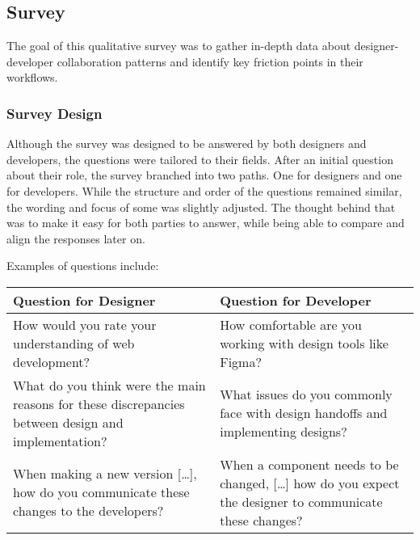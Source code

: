 \newpage
\subsection{Survey}
The goal of this qualitative survey was to gather in-depth data about designer-developer
collaboration patterns and identify key friction points in their workflows.

\subsubsection{Survey Design}
Although the survey was designed to be answered by both designers and developers, the questions were
tailored to their fields. After an initial question about their role, the survey branched into two
paths. One for designers and one for developers. While the structure and order of the questions
remained similar, the wording and focus of some was slightly adjusted. The thought behind that was
to make it easy for both parties to answer, while being able to compare and align the responses
later on.

Examples of questions include: %
\begin{center}
    \begin{tabular}{|m{7.5cm}|m{7.5cm}|}
        \hline
        \textbf{Question for Designer}                                                                         & \textbf{Question for Developer}                                                                                \\
        \hline
        How would you rate your understanding of web development?                                          & How comfortable are you working with design tools like Figma?                                              \\
        \hline
        What do you think were the main reasons for these discrepancies between design and implementation? & What issues do you commonly face with design handoffs and implementing designs?                            \\
        \hline
        When making a new version [\dots], how do you communicate these changes to the developers?         & When a component needs to be changed, [\dots] how do you expect the designer to communicate these changes? \\
        \hline
    \end{tabular}
\end{center}


